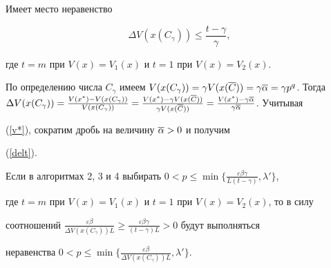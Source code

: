 \begin{cornonum} Имеет место неравенство


\begin{equation}\label{delt}


\Delta V(x(C_\gamma))\leq\frac{t-\gamma}{\gamma},


\end{equation}


где $t=m$ при $V(x)=V_1(x)$ и $t=1$ при $V(x)=V_2(x)$.


\end{cornonum}





\begin{pf}


По определению числа $C_\gamma$ имеем $V(x(C_\gamma))=\gamma


V(x(\o C))=\gamma\o\alpha=\gamma p^q$. Тогда $\Delta


V(x(C_\gamma))=\frac{V(x^*)-V(x(C_\gamma))}{V(x(C_\gamma))}=


\frac{V(x^*)-\gamma V(x(\o C))}{\gamma V(x(\o


C))}=\frac{V(x^*)-\gamma\o\alpha}{\gamma\o\alpha}$. Учитывая


(\ref{v*}), сократим дробь на величину $\overline\alpha>0$ и получим


(\ref{delt}).


\end{pf}





\begin{notenonum}


Если в алгоритмах 2, 3 и 4 выбирать $0<


p\leq\min\{\frac{\varepsilon\beta\gamma}{L(t-\gamma)},\lambda'\}$,


где $t=m$ при $V(x)=V_1(x)$ и $t=1$ при $V(x)=V_2(x)$, то в силу


соотношений $\frac{\varepsilon\beta}{\Delta V(x(C_\gamma))L}


\geq\frac{\varepsilon\beta\gamma}{(t-\gamma)L}>0$ будут выполняться


неравенства $0<p\leq\min\{\frac{\varepsilon\beta}{\Delta


V(x(C_\gamma))L},\lambda'\}$.


\end{notenonum}








